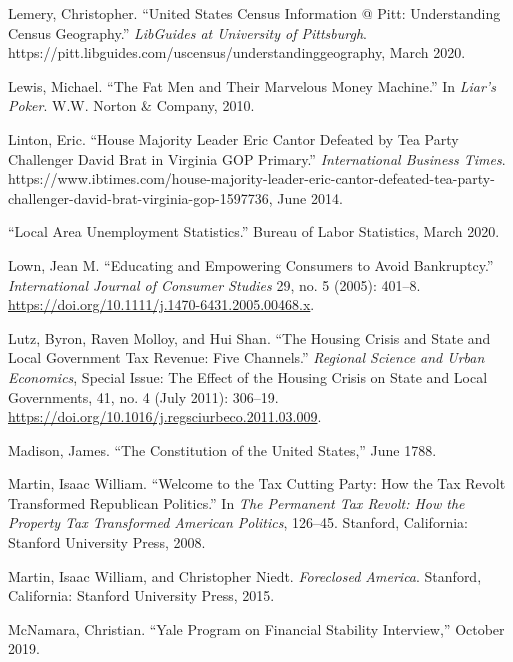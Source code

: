 \documentclass[12pt,oneside]{psthesis}
\begin{document}
\leavevmode\hypertarget{ref-lemery2020united}{}%
Lemery, Christopher. ``United States Census Information @ Pitt: Understanding Census Geography.'' \emph{LibGuides at University of Pittsburgh}. https://pitt.libguides.com/uscensus/understandinggeography, March 2020.

\leavevmode\hypertarget{ref-lewis2010fat}{}%
Lewis, Michael. ``The Fat Men and Their Marvelous Money Machine.'' In \emph{Liar's Poker}. W.W. Norton \& Company, 2010.

\leavevmode\hypertarget{ref-linton2014house}{}%
Linton, Eric. ``House Majority Leader Eric Cantor Defeated by Tea Party Challenger David Brat in Virginia GOP Primary.'' \emph{International Business Times}. https://www.ibtimes.com/house-majority-leader-eric-cantor-defeated-tea-party-challenger-david-brat-virginia-gop-1597736, June 2014.

\leavevmode\hypertarget{ref-2020local}{}%
``Local Area Unemployment Statistics.'' Bureau of Labor Statistics, March 2020.

\leavevmode\hypertarget{ref-lown2005educating}{}%
Lown, Jean M. ``Educating and Empowering Consumers to Avoid Bankruptcy.'' \emph{International Journal of Consumer Studies} 29, no. 5 (2005): 401--8. \url{https://doi.org/10.1111/j.1470-6431.2005.00468.x}.

\leavevmode\hypertarget{ref-lutz2011housing}{}%
Lutz, Byron, Raven Molloy, and Hui Shan. ``The Housing Crisis and State and Local Government Tax Revenue: Five Channels.'' \emph{Regional Science and Urban Economics}, Special Issue: The Effect of the Housing Crisis on State and Local Governments, 41, no. 4 (July 2011): 306--19. \url{https://doi.org/10.1016/j.regsciurbeco.2011.03.009}.

\leavevmode\hypertarget{ref-madison1788constitution}{}%
Madison, James. ``The Constitution of the United States,'' June 1788.

\leavevmode\hypertarget{ref-martin2008welcome}{}%
Martin, Isaac William. ``Welcome to the Tax Cutting Party: How the Tax Revolt Transformed Republican Politics.'' In \emph{The Permanent Tax Revolt: How the Property Tax Transformed American Politics}, 126--45. Stanford, California: Stanford University Press, 2008.

\leavevmode\hypertarget{ref-martin2015foreclosed}{}%
Martin, Isaac William, and Christopher Niedt. \emph{Foreclosed America}. Stanford, California: Stanford University Press, 2015.

\leavevmode\hypertarget{ref-mcnamara2019yale}{}%
McNamara, Christian. ``Yale Program on Financial Stability Interview,'' October 2019.
\end{document}
